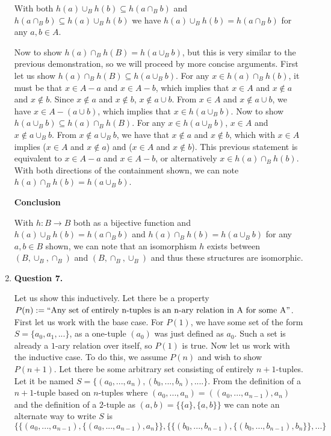 \documentclass{article}
\begin{document}
\begin{enumerate}
				\medskip
				With both $h(a) \cup_{B} h(b) \subseteq h(a \cap_{B} b)$ and  $h(a \cap_{B} b) \subseteq h(a) \cup_{B} h(b)$ we have $h(a) \cup_{B} h(b) = h(a \cap_{B} b)$ for any $a,b \in A$.
				
				\medskip
				Now to show $h(a) \cap_{B} h(B) = h(a \cup_{B} b)$, but this is very similar to the previous demonstration, so we will proceed by more concise arguments. First let us show $h(a) \cap_{B} h(B) \subseteq h(a \cup_{B} b)$. For any $x \in h(a) \cap_{B} h(b)$, it must be that $x \in A - a$ and $x \in A - b$, which implies that $x \in A$ and $x \notin a$ and $x \notin b$. Since $x \notin a$ and $x \notin b$, $x \notin a \cup b$. From $x \in A$ and $x \notin a \cup b$, we have $x \in A - (a \cup b)$, which implies that $x \in h(a \cup_{B} b)$. Now to show $h(a \cup_{B} b) \subseteq h(a) \cap_{B} h(B)$. For any $x \in h(a \cup_{B} b)$, $x \in A$ and $x \notin a \cup_{B} b$. From $x \notin a \cup_{B} b$, we have that $x \notin a$ and $x \notin b$, which with $x \in A$ implies ($x \in A$ and $x \notin a$) and ($x \in A$ and $x \notin b$). This previous statement is equivalent to $x \in A - a$ and $x \in A - b$, or alternatively $x \in h(a) \cap_{B} h(b)$. With both directions of the containment shown, we can note $h(a) \cap_{B} h(b) = h(a \cup_{B} b)$.
				
				\medskip
				\textbf{Conclusion}
				\medskip
				
				With $h: B \xrightarrow{} B$ both as a bijective function and $h(a) \cup_{B} h(b) = h(a \cap_{B} b)$ and $h(a) \cap_{B} h(b) = h(a \cup_{B} b)$ for any $a,b \in B$ shown, we can note that an isomorphism $h$ exists between $(B, \cup_{B}, \cap_{B})$ and $(B, \cap_{B}, \cup_{B})$ and thus these structures are isomorphic.
				
				\medskip
				\item \textbf{Question 7.}
				\medskip
				
				Let us show this inductively. Let there be a property $P(n) := ``\text{Any set of entirely n-tuples is an n-ary relation in A for some A''}$. First let us work with the base case. For $P(1)$, we have some set of the form $S = \{a_0, a_1, ...\}$, as a one-tuple $(a_0)$ was just defined as $a_0$. Such a set is already a $1$-ary relation over itself, so $P(1)$ is true. Now let us work with the inductive case. To do this, we assume $P(n)$ and wish to show $P(n + 1)$. Let there be some arbitrary set consisting of entirely $n + 1$-tuples. Let it be named $S = \{(a_0, ..., a_{n}), (b_0, ..., b_{n}), ....\}$. From the definition of a $n + 1$-tuple based on $n$-tuples where $(a_0, ..., a_n) = ((a_0, ..., a_{n - 1}), a_n)$ and the definition of a $2$-tuple as $(a,b) = \{\{a\}, \{a,b\}\}$ we can note an alternate way to write $S$ is $$\{\{(a_0,...,a_{n - 1}), \{(a_0,...,a_{n - 1}), a_n\}\}, \{\{(b_0,...,b_{n - 1}), \{(b_0,...,b_{n - 1}), b_n\}\}, ...\}$$
				

\end{enumerate}
\end{document}
